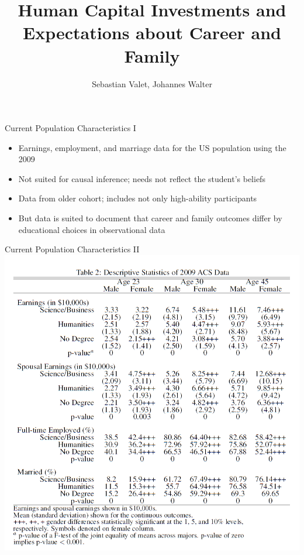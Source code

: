 \documentclass[12pt]{beamer}
\author{Sebastian Valet, Johannes Walter}
\title{Human Capital Investments and Expectations about Career and Family}
\begin{document}
\begin{frame}
\titlepage
\end{frame}


\begin{frame}{Current Population Characteristics I}
    \begin{itemize}
        \item Earnings, employment, and marriage data  for the US population using the 2009
        \item Not suited for causal inference; needs not reflect the student's beliefs
        \item Data from older cohort; includes not only high-ability participants
        \item But data is suited to document that career and family outcomes differ by educational choices in observational data
    \end{itemize}
\end{frame}

\begin{frame}{Current Population Characteristics II}
    \includegraphics[scale=0.4]{Table2.png}
\end{frame}
\end{document}
